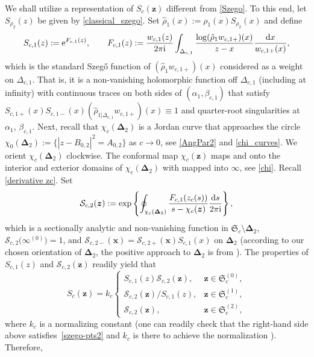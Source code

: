 \documentclass[10pt,a4paper]{amsart}
\numberwithin{equation}{section}
\newcommand{\ic}{\mathrm{i}}
\newcommand{\RS}{\boldsymbol{\mathfrak{S}}}
\newcommand{\z}	{{\boldsymbol z}}
\newcommand{\x}	{{\boldsymbol x}}
\begin{document}
We shall utilize a representation of $ S_c(\z) $ different from \eqref{Szego}. To this end, let $ S_{\rho_2}(z) $ be given by \eqref{classical_szego}. Set $ \hat\rho_1(x) := \rho_1(x)S_{\rho_2}(x) $ and define
\[
S_{c,1}(z) := {\rm e}^{F_{c,1}(z)}, \qquad F_{c,1}(z) := \frac{w_{c,1}(z)}{2\pi\ic}\int_{\Delta_{c,1}}\frac{\log(\hat\rho_1w_{c,1+})(x)}{z-x}\frac{{\rm d}x}{w_{c,1+}(x)},
\]
which is the standard Szeg\H{o} function of $ (\hat\rho_1w_{c,1+})(x)$ considered as a weight on $ \Delta_{c,1} $. That is, it is a non-vanishing holomorphic function off $ \Delta_{c,1} $ (including at infinity) with continuous traces on both sides of $ (\alpha_1,\beta_{c,1}) $ that satisfy
$
S_{c,1+}(x)S_{c,1-}(x) (\hat\rho_{1|\Delta_{c,1}}w_{c,1+})(x) \equiv 1
$
and quarter-root singularities at $ \alpha_1$, $\beta_{c,1} $. Next, recall that $ \chi_c(\boldsymbol\Delta_2) $ is a Jordan curve that approaches the circle~${ \chi_0(\boldsymbol\Delta_2) := \bigl\{|z-B_{0,2}|^2=A_{0,2}\bigr\}} $ as $ c\to0 $, see \eqref{AngPar2} and \eqref{chi_curves}. We orient $ \chi_c(\boldsymbol\Delta_2) $ clockwise. The conformal map $ \chi_c(\z) $ maps \smash{$ \RS_c^{(2)}\setminus\boldsymbol\Delta_2 $} and \smash{$ \RS_c\setminus \RS_c^{(2)} $} onto the interior and exterior domains of $ \chi_c(\boldsymbol\Delta_2) $ with  mapped into $ \infty $, see \eqref{chi}. Recall \eqref{derivative zc}. Set
\[
\mathcal S_{c,2}(\z) := \exp\left\{\oint_{\chi_c(\boldsymbol\Delta_2)}\frac{F_{c,1}(z_c(s))}{s-\chi_c(\z)}\frac{{\rm d}s}{2\pi\ic}\right\},
\]
which is a sectionally analytic and non-vanishing function in $ \RS_c\setminus\boldsymbol\Delta_2 $, $ \mathcal S_{c,2}\bigl(\infty^{(0)}\bigr) = 1 $, and $ \mathcal S_{c,2-}(\x) = \mathcal S_{c,2+}(\x) S_{c,1}(x) $ on $ \boldsymbol\Delta_2 $ (according to our chosen orientation of $ \boldsymbol\Delta_2 $, the positive approach to $ \boldsymbol\Delta_2 $ is from \smash{$ \RS_c^{(0)} $}). The properties of $ S_{c,1}(z) $ and $ \mathcal S_{c,2}(\z) $ readily yield that
\[
S_c(\z) = k_c\begin{cases}
S_{c,1}(z)\mathcal S_{c,2}(\z), & \z\in\RS_c^{(0)}, \\
\mathcal S_{c,2}(\z)/S_{c,1}(z), & \z\in\RS_c^{(1)}, \\
\mathcal S_{c,2}(\z), & \z\in\RS_c^{(2)},
\end{cases}
\]
where $ k_c $ is a normalizing constant \big(one can readily check that the right-hand side above satisfies~\eqref{szego-pts2} and $ k_c $ is there to achieve the normalization \big). Therefore,
\end{document}
